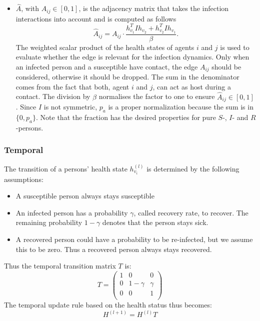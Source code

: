 \begin{itemize}
\begin{itemize}
		\item $\hat{A}$, with $\hat{A}_{ij}\in [0, 1]$, is the adjacency matrix that takes the infection interactions into account and is computed as follows
		\begin{equation}
		\hat{A}_{ij} = A_{ij}\cdot \frac{ h_{v_1}^T I h_{v_2} + h_{v_2}^T I h_{v_1} }{\beta}.
		\end{equation}
		The weighted scalar product of the health states of agents $i$ and $j$ is used to evaluate whether the edge is relevant for the infection dynamics. Only when an infected person and a susceptible have contact, the edge $A_{ij}$ should be considered, otherwise it should be dropped.	The sum in the denominator comes from the fact that both, agent $i$ and $j$, can act as host during a contact. The division by $\beta$ normalises the factor to one to ensure $\hat{A}_{ij} \in [0, 1]$. Since $I$ is not symmetric, $p_a$ is a proper normalization because the sum is in $\{0, p_a\}$. Note that the fraction has the desired properties for pure $S$-, $I$- and $R$-persons.
	\end{itemize}
\end{itemize}


\subsubsection{Temporal}
The transition of a persons' health state $h_{v_i}^{(l)}$ is determined by the following assumptions:
\begin{itemize}
	\item A susceptible person always stays susceptible
	\item An infected person has a probability $\gamma$, called recovery rate, to recover. The remaining probability $1-\gamma$ denotes that the person stays sick.
	\item A recovered person could have a probability to be re-infected, but we assume this to be zero. Thus a recovered person always stays recovered.
\end{itemize}
Thus the temporal transition matrix $T$ is:
\begin{equation}
T = 
\begin{pmatrix}
1 &     0    & 0      \\
0 & 1-\gamma & \gamma \\
0 &     0    & 1      \\
\end{pmatrix}
\end{equation}
The temporal update rule based on the health status thus becomes:
\begin{equation}
H^{(l+1)} = H^{(l)} T
\end{equation}

